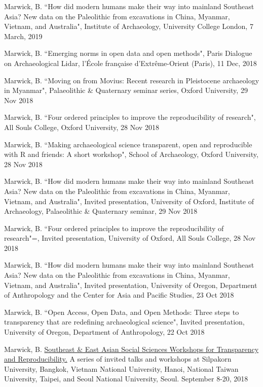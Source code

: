 \ind Marwick, B. ``How did modern humans make their way into mainland Southeast Asia? New data on the Paleolithic from excavations in China, Myanmar, Vietnam, and Australia", Institute of Archaeology, University College London, 7 March, 2019

\ind Marwick, B. ``Emerging norms in open data and open methods", Paris Dialogue on Archaeological Lidar, l'École française d'Extrême-Orient (Paris), 11 Dec, 2018

\ind Marwick, B. ``Moving on from Movius: Recent research in Pleistocene archaeology in Myanmar", Palaeolithic \& Quaternary seminar series, Oxford University, 29 Nov 2018

\ind Marwick, B. ``Four ordered principles to improve the reproducibility of research", All Souls College, Oxford University, 28 Nov 2018

\ind Marwick, B. ``Making archaeological science transparent, open and reproducible with R and friends: A short workshop",  School of Archaeology, Oxford University, 28 Nov 2018

\ind Marwick, B. ``How did modern humans make their way into mainland Southeast Asia? New data on the Paleolithic from excavations in China, Myanmar, Vietnam, and Australia", Invited presentation, University of Oxford, Institute of Archaeology, Palaeolithic \& Quaternary seminar, 29 Nov 2018

\ind Marwick, B. ``Four ordered principles to improve the reproducibility of research"=, Invited presentation, University of Oxford, All Souls College, 28 Nov 2018

\ind Marwick, B. ``How did modern humans make their way into mainland Southeast Asia? New data on the Paleolithic from excavations in China, Myanmar, Vietnam, and Australia", Invited presentation, University of Oregon, Department of Anthropology and the Center for Asia and Pacific Studies, 23 Oct 2018

\ind Marwick, B. ``Open Access, Open Data, and Open Methods: Three steps to transparency that are redefining archaeological science", Invited presentation, University of Oregon, Department of Anthropology, 22 Oct 2018

\ind Marwick, B. \href{https://osf.io/ybj43/}{Southeast \& East Asian Social Sciences Workshops for Transparency and Reproducibility.} A series of invited talks and workshops at Silpakorn University, Bangkok, Vietnam National University, Hanoi, National Taiwan University, Taipei, and Seoul National University, Seoul. September 8-20, 2018

